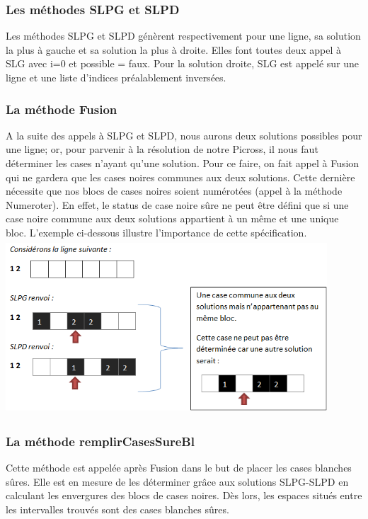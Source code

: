 \documentclass{article}
\begin{document}
\subsubsection{Les m\'ethodes SLPG et SLPD}
Les m\'ethodes SLPG et SLPD g\'en\`erent respectivement pour une ligne, sa solution la plus \`a gauche et sa solution la plus \`a droite. Elles font toutes deux appel \`a SLG avec i=0 et possible = faux. 
\newline
Pour la solution droite, SLG est appel\'e sur une ligne et une liste d'indices pr\'ealablement invers\'ees.
\subsubsection{La m\'ethode Fusion}
A la suite des appels \`a SLPG et SLPD, nous aurons deux solutions possibles pour une ligne; or, pour parvenir \`a la r\'esolution de notre Picross, il nous faut d\'eterminer les cases n'ayant qu'une solution. 
\newline
Pour ce faire, on fait appel \`a Fusion qui ne gardera que les cases noires communes aux deux solutions.
Cette derni\`ere n\'ecessite que nos blocs de cases noires soient num\'erot\'ees (appel \`a la m\'ethode Numeroter).
\newline
En effet, le status de case noire s\^ure ne peut \^etre d\'efini que si une case noire commune aux deux solutions appartient \`a un m\^eme et une unique bloc.
\newline
L'exemple ci-dessous illustre l'importance de cette sp\'ecification.  
\newline
\includegraphics[height=6.5cm,width=12cm]{Exemple1}
\subsubsection{La m\'ethode remplirCasesSureBl}
Cette m\'ethode est appel\'ee apr\`es Fusion dans le but de placer les cases blanches s\^ures. Elle est en mesure de les d\'eterminer gr\^ace aux solutions SLPG-SLPD en calculant les envergures des blocs de cases noires. D\`es lors, les espaces situ\'es entre les intervalles trouv\'es sont des cases blanches s\^ures.
\end{document}
